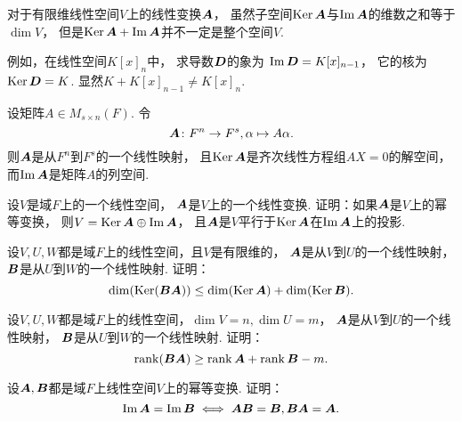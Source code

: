 \begin{remark}
对于有限维线性空间\(V\)上的线性变换\(\boldsymbol{A}\)，
虽然子空间\(\operatorname{Ker}\boldsymbol{A}\)与\(\operatorname{Im}\boldsymbol{A}\)的维数之和等于\(\dim V\)，
但是\(\operatorname{Ker}\boldsymbol{A}+\operatorname{Im}\boldsymbol{A}\)并不一定是整个空间\(V\).

例如，在线性空间\(K[x]_n\)中，
求导数\(\boldsymbol{D}\)的象为
\(\operatorname{Im}\boldsymbol{D}=K[x]_{n-1}\)，
它的核为\(\operatorname{Ker}\boldsymbol{D}=K\).
显然\(K+K[x]_{n-1}\neq K[x]_n\).
\end{remark}

\begin{example}
设矩阵\(A \in M_{s \times n}(F)\).
令\[
	\boldsymbol{A}\colon F^n \to F^s, \alpha \mapsto A\alpha.
\]
则\(\boldsymbol{A}\)是从\(F^n\)到\(F^s\)的一个线性映射，
且\(\operatorname{Ker}\boldsymbol{A}\)是齐次线性方程组\(AX=0\)的解空间，
而\(\operatorname{Im}\boldsymbol{A}\)是矩阵\(A\)的列空间.
\end{example}

\begin{example}
设\(V\)是域\(F\)上的一个线性空间，
\(\boldsymbol{A}\)是\(V\)上的一个线性变换.
证明：如果\(\boldsymbol{A}\)是\(V\)上的幂等变换，
则\(V = \operatorname{Ker}\boldsymbol{A} \oplus \operatorname{Im}\boldsymbol{A}\)，
且\(\boldsymbol{A}\)是\(V\)平行于\(\operatorname{Ker}\boldsymbol{A}\)在\(\operatorname{Im}\boldsymbol{A}\)上的投影.
\end{example}

\begin{example}
设\(V,U,W\)都是域\(F\)上的线性空间，且\(V\)是有限维的，
\(\boldsymbol{A}\)是从\(V\)到\(U\)的一个线性映射，
\(\boldsymbol{B}\)是从\(U\)到\(W\)的一个线性映射.
证明：\[
	\dim(\operatorname{Ker}(\boldsymbol{B}\boldsymbol{A}))
	\leq
	\dim(\operatorname{Ker}\boldsymbol{A})
	+ \dim(\operatorname{Ker}\boldsymbol{B}).
\]
\end{example}

\begin{example}
设\(V,U,W\)都是域\(F\)上的线性空间，\(\dim V = n,\dim U = m\)，
\(\boldsymbol{A}\)是从\(V\)到\(U\)的一个线性映射，
\(\boldsymbol{B}\)是从\(U\)到\(W\)的一个线性映射.
证明：\[
	\rank(\boldsymbol{B}\boldsymbol{A})
	\geq \rank\boldsymbol{A} + \rank\boldsymbol{B} - m.
\]
\end{example}

\begin{example}
设\(\boldsymbol{A},\boldsymbol{B}\)都是域\(F\)上线性空间\(V\)上的幂等变换.
证明：\[
	\operatorname{Im}\boldsymbol{A} = \operatorname{Im}\boldsymbol{B}
	\iff
	\boldsymbol{A}\boldsymbol{B} = \boldsymbol{B},
	\boldsymbol{B}\boldsymbol{A} = \boldsymbol{A}.
\]
\end{example}

